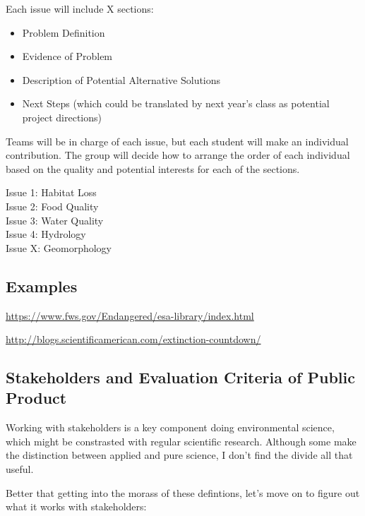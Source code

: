 \documentclass{article}\usepackage[]{graphicx}\usepackage[]{color}
\begin{document}
Each issue will include X sections:

\begin{itemize}
  \item Problem Definition
  \item Evidence of Problem
  \item Description of Potential Alternative Solutions
  \item Next Steps (which could be translated by next year's class as potential project directions)
\end{itemize}


Teams will be in charge of each issue, but each student will make an individual contribution. The group will decide how to arrange the order of each individual based on the quality and potential interests for each of the sections.  

\begin{description}
  \item[Issue 1: Habitat Loss] 
  \item[Issue 2: Food Quality] 
  \item[Issue 3: Water Quality]
  \item[Issue 4: Hydrology]
  \item[Issue X: Geomorphology]
\end{description}

\subsection{Examples}

\href{https://www.fws.gov/Endangered/esa-library/index.html}{https://www.fws.gov/Endangered/esa-library/index.html}

\href{http://blogs.scientificamerican.com/extinction-countdown/}{http://blogs.scientificamerican.com/extinction-countdown/}

\subsection{Stakeholders and Evaluation Criteria of Public Product}

Working with stakeholders is a key component doing environmental science, which might be constrasted with regular scientific research. Although some make the distinction between applied and pure science, I don't find the divide all that useful. 

Better that getting into the morass of these defintions, let's move on to figure out what it works with stakeholders:
\end{document}
